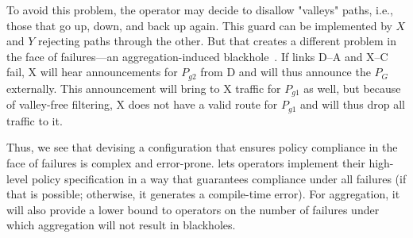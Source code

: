 To avoid this problem, the operator may decide to disallow "valleys" paths, i.e., those that go up, down, and back up again. This guard can be implemented by $X$ and $Y$ rejecting paths through the other. But that creates a different problem in the face of failures---an aggregation-induced blackhole~\cite{xx}. If links D--A and X--C fail, X will hear announcements for $P_{g2}$ from D and will thus announce the $P_G$ externally. This announcement will bring to X traffic for $P_{g1}$ as well, but because of valley-free filtering, X does not have a valid route for $P_{g1}$ and will thus drop all traffic to it.

Thus, we see that devising a configuration that ensures policy compliance in the face of failures is complex and error-prone. \sysname lets operators implement their high-level policy specification in a way that guarantees compliance under all failures (if that is possible; otherwise, it generates a compile-time error). For aggregation, it will also provide a lower bound to operators on the number of failures under which aggregation will not result in blackholes.



%
%
%
%

